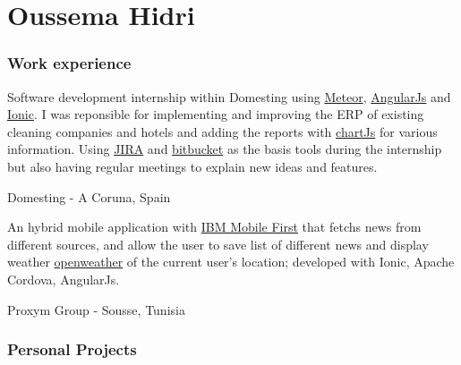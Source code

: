 \documentclass{tccv}
\begin{document}
\part{Oussema Hidri}

\section{Work experience}

\begin{eventlist}


Software development internship within Domesting using \href{https://www.meteor.com/}{Meteor}, \href{https://angularjs.org/}{AngularJs} and \href{https://ionicframework.com/}{Ionic}. I was reponsible for implementing and improving the ERP of existing cleaning companies and hotels and adding the reports with \href{http://www.chartjs.org/}{chartJs} for various information. Using \href{https://www.atlassian.com/software/jira}{JIRA} and \href{https://bitbucket.org/product}{bitbucket} as the basis tools during the internship but also having regular meetings to explain new ideas and features.


     {Domesting - A Coruna, Spain}


An hybrid mobile application with \href{https://www.ibm.com/mobile/}{IBM Mobile First} that fetchs news from different sources, and allow the user to save list of different news and display weather \href{https://openweathermap.org}{openweather} of the current user’s location; developed with Ionic, Apache Cordova, AngularJs.

     {Proxym Group - Sousse, Tunisia}

\end{eventlist}

\section{Personal Projects}
\end{document}
